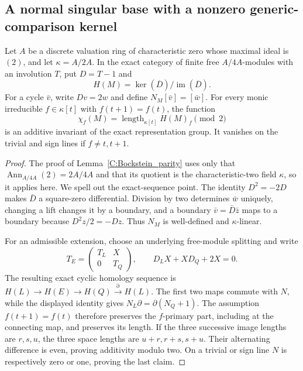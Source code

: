 \subsection{A normal singular base with a nonzero generic-comparison kernel}

\begin{lemma}
\label{C:dyadic_residue_Bockstein}
Let $A$ be a discrete valuation ring of characteristic zero whose
maximal ideal is $(2)$, and let $\kappa=A/2A$.
In the exact category of finite free $A/4A$-modules with an
involution $T$, put $D=T-1$ and
\[
 H(M)=\ker(\overline D)/\operatorname{im}(\overline D).
\]
For a cycle $\bar v$, write $Dv=2w$ and define
$N_M[\bar v]=[\bar w]$.
For every monic irreducible $f\in\kappa[t]$ with
$f(t+1)=f(t)$, the function
\[
 \chi_f(M)=\operatorname{length}_{\kappa[t]}H(M)_f\pmod2
                                                               \tag{C.1.N1}
\]
is an additive invariant of the exact representation group.
It vanishes on the trivial and sign lines if $f\ne t,t+1$.
\end{lemma}
\begin{proof}
The proof of Lemma~\ref{C:Bockstein_parity} uses only that
$\operatorname{Ann}_{A/4A}(2)=2A/4A$ and that its quotient is the
characteristic-two field $\kappa$, so it applies here. We spell
out the exact-sequence point. The identity $D^2=-2D$ makes
$\bar D$ a square-zero differential. Division by two determines
$\bar w$ uniquely, changing a lift changes it by a boundary,
and a boundary $\bar v=\bar D\bar z$ maps to a boundary because
$D^2z/2=-Dz$. Thus $N_M$ is well-defined and $\kappa$-linear.

For an admissible extension, choose an underlying free-module
splitting and write
\[
 T_E=\begin{pmatrix}T_L&X\\0&T_Q\end{pmatrix},\qquad
 D_LX+XD_Q+2X=0.
\]
The resulting exact cyclic homology sequence is
$H(L)\to H(E)\to H(Q)\xrightarrow{\partial}H(L)$.
The first two maps commute with $N$, while the displayed
identity gives $N_L\partial=\partial(N_Q+1)$.
The assumption $f(t+1)=f(t)$ therefore preserves the $f$-primary
part, including at the connecting map, and preserves its length.
If the three successive image lengths are $r,s,u$, the three
space lengths are $u+r,r+s,s+u$. Their alternating difference
is even, proving additivity modulo two. On a trivial or sign
line $N$ is respectively zero or one, proving the last claim.
\end{proof}


